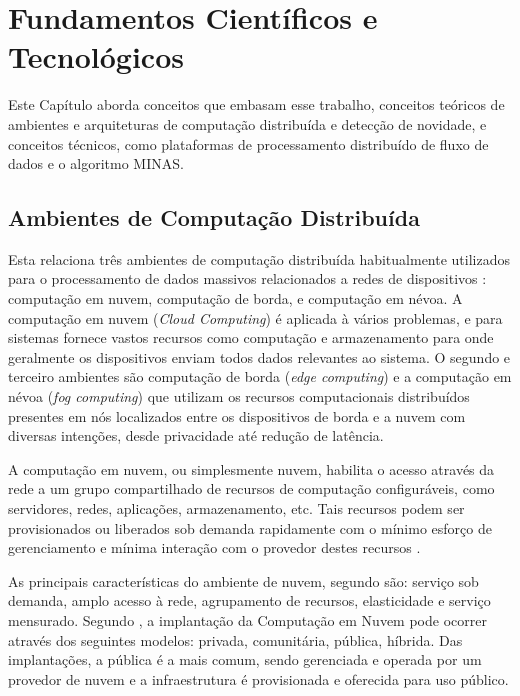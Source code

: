 
\chapter{Fundamentos Científicos e Tecnológicos}\label{cha:fundamentos}

Este Capítulo aborda conceitos que embasam esse trabalho,
conceitos teóricos de
ambientes e arquiteturas de computação distribuída e detecção de novidade,
e conceitos técnicos, como plataformas de processamento distribuído de fluxo
de dados e o algoritmo MINAS.

\section{Ambientes de Computação Distribuída}

Esta \Section relaciona três ambientes de computação distribuída habitualmente
utilizados para o processamento de dados massivos relacionados a redes de
dispositivos \iot: computação em nuvem, computação de borda, e computação em névoa.
A computação em nuvem (\emph{Cloud Computing}) é
aplicada à vários problemas, e para sistemas \iot 
fornece vastos recursos como computação e armazenamento para onde geralmente os dispositivos
enviam todos dados relevantes ao sistema.
O segundo e terceiro ambientes são computação de borda (\emph{edge computing})
e a computação em névoa (\emph{fog computing}) que utilizam os recursos
computacionais distribuídos presentes em nós localizados entre os dispositivos
de borda e a nuvem com diversas 
intenções, desde privacidade até redução de latência.


A computação em nuvem, ou simplesmente nuvem, habilita o acesso através da rede
a um grupo compartilhado de recursos de computação configuráveis, como
servidores, redes, aplicações, armazenamento, etc.
Tais recursos podem ser provisionados ou liberados sob
demanda rapidamente com o mínimo esforço de gerenciamento
e mínima interação com o provedor destes recursos \cite{NIST2011}.

As principais características do ambiente de nuvem, segundo 
são: serviço sob demanda, amplo acesso à rede, agrupamento de recursos,
elasticidade e serviço mensurado.
Segundo , a implantação da Computação em Nuvem pode
ocorrer através dos seguintes modelos: privada, comunitária, pública, híbrida.
Das implantações, a pública é a mais comum, sendo gerenciada e operada por um
provedor de nuvem e a infraestrutura é provisionada e oferecida para uso
público.


